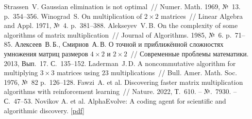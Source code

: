 \documentclass[12pt]{article}
\begin{document}
%
\begin{thebibliography}{99}

   Strassen~V. Gaussian elimination is not optimal~// Numer. Math. 1969, №~13. p.~354--356.
   Winograd~S. On multiplication of $2 \times 2$ matrices~// Linear Algebra and Appl. 1971, №~4. p.~381--388.
   Alekseyev~V.\,B. On the complexity of some algorithms of matrix multiplication~// Journal of Algorithms. 1985, №~6. p.~71--85.
   Алексеев~В.\,Б., Смирнов~А.\,В. О точной и приближённой сложностях умножения матриц размеров $4 \times 2$ и $2 \times 2$~// Современные проблемы математики. 2013, Вып.~17. С.~135--152.
   Laderman~J.\,D. A noncommutative algorithm for multiplying $3 \times 3$ matrices using $23$ multiplications~// Bull. Amer. Math. Soc. 1976, №~82 p.~126--128.
   Fawzi~A. et al. Discovering faster matrix multiplication algorithms with reinforcement learning~// Nature. 2022,  Т.~610. – №.~7930. – С.~47--53.
   Novikov A. et al. AlphaEvolve: A coding agent for scientific and algorithmic discovery. [\href{https://storage.googleapis.com/deepmind-media/DeepMind.com/Blog/alphaevolve-a-gemini-powered-coding-agent-for-designing-advanced-algorithms/AlphaEvolve.pdf}{pdf}]
\end{thebibliography}
\end{document}
